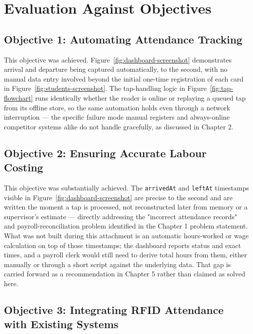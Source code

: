 \section{Evaluation Against Objectives}

\subsection{Objective 1: Automating Attendance Tracking}

This objective was achieved. Figure~\ref{fig:dashboard-screenshot} demonstrates arrival and departure being captured automatically, to the second, with no manual data entry involved beyond the initial one-time registration of each card in Figure~\ref{fig:students-screenshot}. The tap-handling logic in Figure~\ref{fig:tap-flowchart} runs identically whether the reader is online or replaying a queued tap from its offline store, so the same automation holds even through a network interruption — the specific failure mode manual registers and always-online competitor systems alike do not handle gracefully, as discussed in Chapter 2.

\subsection{Objective 2: Ensuring Accurate Labour Costing}

This objective was substantially achieved. The \texttt{arrivedAt} and \texttt{leftAt} timestamps visible in Figure~\ref{fig:dashboard-screenshot} are precise to the second and are written the moment a tap is processed, not reconstructed later from memory or a supervisor's estimate — directly addressing the "incorrect attendance records" and payroll-reconciliation problem identified in the Chapter 1 problem statement. What was not built during this attachment is an automatic hours-worked or wage calculation on top of those timestamps; the dashboard reports status and exact times, and a payroll clerk would still need to derive total hours from them, either manually or through a short script against the underlying data. That gap is carried forward as a recommendation in Chapter 5 rather than claimed as solved here.

\subsection{Objective 3: Integrating RFID Attendance with Existing Systems}

